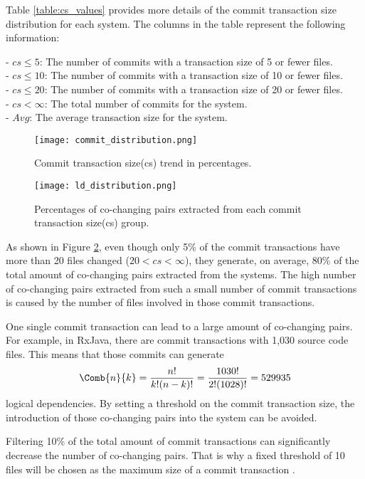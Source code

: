 Table \ref{table:cs_values} provides more details of the commit transaction size distribution for each system. The columns in the table represent the following information:

\hspace{-4em}- \textit{$cs\leq 5$}: The number of commits with a transaction size of 5 or fewer files. \\
- \textit{$cs\leq 10$}: The number of commits with a transaction size of 10 or fewer files. \\
- \textit{$cs\leq 20$}: The number of commits with a transaction size of 20 or fewer files. \\
- \textit{$cs<\infty$}: The total number of commits for the system. \\
- \textit{$Avg$}: The average transaction size for the system.


\begin{figure}[!h]
\centering
\texttt{[image: commit\_distribution.png]}
\caption{Commit transaction size(cs) trend in percentages.}
\label{fig:fig_cs}
\centering
\end{figure}


\begin{figure}[!h]
\centering
\texttt{[image: ld\_distribution.png]}
\caption{Percentages of co-changing pairs extracted from each commit transaction size(cs) group.}
\label{fig:fig_ld_cs}
\centering
\end{figure}

As shown in Figure \ref{fig:fig_ld_cs}, even though only 5\% of the commit transactions have more than 20 files changed ($20<cs<\infty$), they generate, on average, 80\% of the total amount of co-changing pairs extracted from the systems.  
The high number of co-changing pairs extracted from such a small number of commit transactions is caused by the number of files involved in those commit transactions.  

One single commit transaction can lead to a large amount of co-changing pairs. For example, in RxJava, there are commit transactions with 1,030 source code files. This means that those commits can generate
\[
\Comb{n}{k}=\frac{n!}{k!(n-k)!} = \frac{1030!}{2!(1028)!} = 529 935
\]
logical dependencies. By setting a threshold on the commit transaction size, the introduction of those co-changing pairs into the system can be avoided.

Filtering 10\% of the total amount of commit transactions can significantly decrease the number of co-changing pairs. That is why a fixed threshold of 10 files will be chosen as the maximum size of a commit transaction \cite{DepSACI}.



